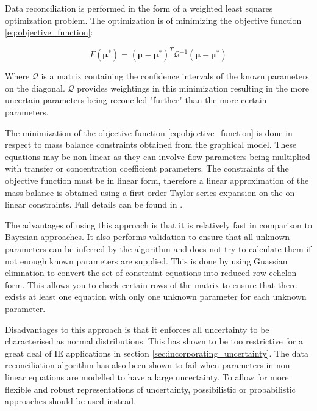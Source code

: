 \documentclass[ %
                    author={Tom Jager},
                supervisor={Dr. Daniel Schien},
                    degree={MEng},
                     title={A Bayesian Inference Engine for UMIS Structured Data},
                  subtitle={},
                      type={research},
                      year={2019} ]{dissertation}
\begin{document}
Data reconciliation is performed in the form of a weighted least squares optimization problem. The optimization is of minimizing the objective function \ref{eq:objective_function}: 

\begin{equation}
\label{eq:objective_function}
    F(\pmb{\mu^*}) = (\pmb{\mu} - \pmb{\mu^*})^T \pmb{\mathcal{Q}}^{-1}(\pmb{\mu} - \pmb{\mu^*})
\end{equation}

Where $\mathcal{Q}$ is a matrix containing the confidence intervals of the known parameters on the diagonal. $\mathcal{Q}$ provides weightings in this minimization resulting in the more uncertain parameters being reconciled "further" than the more certain parameters. 

The minimization of the objective function \ref{eq:objective_function} is done in respect to mass balance constraints obtained from the graphical model. These equations may be non linear as they can involve flow parameters being multiplied with transfer or concentration coefficient parameters. The constraints of the objective function must be in linear form, therefore a linear approximation of the mass balance is obtained using a first order Taylor series expansion on the on-linear constraints. Full details can be found in \cite{cencic2016nonlinear}. 

The advantages of using this approach is that it is relatively fast in comparison to Bayesian approaches. It also performs validation to ensure that all unknown parameters can be inferred by the algorithm and does not try to calculate them if not enough known parameters are supplied. This is done by using Guassian elimnation to convert the set of constraint equations into reduced row echelon form. This allows you to check certain rows of the matrix to ensure that there exists at least one equation with only one unknown parameter for each unknown parameter.

Disadvantages to this approach is that it enforces all uncertainty to be characterised as normal distributions. This has shown to be too restrictive for a great deal of IE applications in section \ref{sec:incorporating_uncertainty}. The data reconciliation algorithm has also been shown to fail when parameters in non-linear equations are modelled to have a large uncertainty. To allow for more flexible and robust representations of uncertainty, possibilistic or probabilistic approaches should be used instead.
\end{document}
